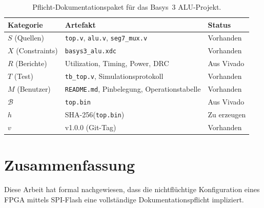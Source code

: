 ﻿\documentclass[a4paper,12pt]{article}
\theoremstyle{definition}
\begin{document}
\begin{table}[htbp]
    \centering
    \caption{Pflicht-Dokumentationspaket für das Basys~3 ALU-Projekt.}
    \label{tab:alupaket}
    \begin{tabular}{@{}lll@{}}
        \toprule
        Kategorie & Artefakt & Status \\
        \midrule
        $S$ (Quellen)      & \texttt{top.v}, \texttt{alu.v}, \texttt{seg7\_mux.v} & Vorhanden \\
        $X$ (Constraints)  & \texttt{basys3\_alu.xdc}                              & Vorhanden \\
        $R$ (Berichte)     & Utilization, Timing, Power, DRC                       & Aus Vivado \\
        $T$ (Test)         & \texttt{tb\_top.v}, Simulationsprotokoll              & Vorhanden \\
        $M$ (Benutzer)     & \texttt{README.md}, Pinbelegung, Operationstabelle    & Vorhanden \\
        $\mathcal{B}$      & \texttt{top.bin}                                      & Aus Vivado \\
        $h$                & SHA-256(\texttt{top.bin})                             & Zu erzeugen \\
        $v$                & v1.0.0 (Git-Tag)                                      & Vorhanden \\
        \bottomrule
    \end{tabular}
\end{table}

\section{Zusammenfassung}

Diese Arbeit hat formal nachgewiesen, dass die nichtflüchtige Konfiguration
eines FPGA mittels SPI-Flash eine vollständige Dokumentationspflicht impliziert.
\end{document}
